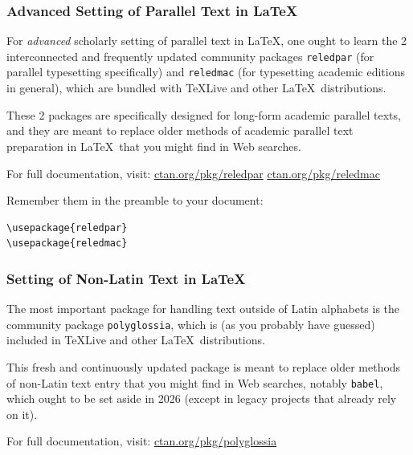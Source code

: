 \documentclass{beamer}
\begin{document}
\begin{frame}[fragile]
	\frametitle[Advanced Parallel Text]{Advanced Setting of Parallel Text in \LaTeX}
	
For \emph{advanced} scholarly setting of parallel text in \LaTeX, one ought to learn the 2 interconnected and frequently updated community packages \texttt{reledpar} (for parallel typesetting specifically) and \texttt{reledmac} (for typesetting academic editions in general), which are bundled with TeXLive and other \LaTeX\ distributions. \break

These 2 packages are specifically designed for long-form academic parallel texts, and they are meant to replace older methods of academic parallel text preparation in \LaTeX\ that you might find in Web searches. \break

For full documentation, visit: \break
\href{https://ctan.org/pkg/reledpar}{ctan.org/pkg/reledpar} \break
\href{https://ctan.org/pkg/reledmac}{ctan.org/pkg/reledmac} \break

Remember them in the preamble to your document:

{\scriptsize \begin{lstlisting}
\usepackage{reledpar}
\usepackage{reledmac}
\end{lstlisting}}

\end{frame}

\begin{frame}[fragile]
	\frametitle[Non-Latin Text]{Setting of Non-Latin Text in \LaTeX}

The most important package for handling text outside of Latin alphabets is the community package \texttt{polyglossia}, which is (as you probably have guessed) included in TeXLive and other \LaTeX\ distributions. \break

This fresh and continuously updated package is meant to replace older methods of non-Latin text entry that you might find in Web searches, notably \texttt{babel}, which ought to be set aside in 2026 (except in legacy projects that already rely on it). \break

For full documentation, visit: \break
\href{https://www.ctan.org/pkg/polyglossia}{ctan.org/pkg/polyglossia} \break

\end{frame}
\end{document}
